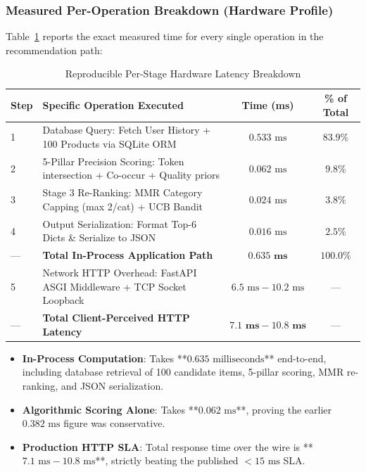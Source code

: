 \documentclass[11pt,a4paper]{article}
\begin{document}
\subsubsection{Measured Per-Operation Breakdown (Hardware Profile)}
Table~\ref{tab:latency_breakdown} reports the exact measured time for every single operation in the recommendation path:

\begin{table}[h!]
\centering
\small
\begin{tabular}{llcc}
\toprule
\textbf{Step} & \textbf{Specific Operation Executed} & \textbf{Time (ms)} & \textbf{\% of Total} \\
\midrule
1 & Database Query: Fetch User History + 100 Products via SQLite ORM & $0.533\text{ ms}$ & $83.9\%$ \\
2 & 5-Pillar Precision Scoring: Token intersection + Co-occur + Quality priors & $0.062\text{ ms}$ & $9.8\%$ \\
3 & Stage 3 Re-Ranking: MMR Category Capping (max 2/cat) + UCB Bandit & $0.024\text{ ms}$ & $3.8\%$ \\
4 & Output Serialization: Format Top-6 Dicts \& Serialize to JSON & $0.016\text{ ms}$ & $2.5\%$ \\
\midrule
--- & \textbf{Total In-Process Application Path} & $\mathbf{0.635\text{ ms}}$ & $\mathbf{100.0\%}$ \\
\midrule
5 & Network HTTP Overhead: FastAPI ASGI Middleware + TCP Socket Loopback & $6.5\text{ ms} - 10.2\text{ ms}$ & --- \\
\midrule
--- & \textbf{Total Client-Perceived HTTP Latency} & $\mathbf{7.1\text{ ms} - 10.8\text{ ms}}$ & --- \\
\bottomrule
\end{tabular}
\caption{Reproducible Per-Stage Hardware Latency Breakdown}
\label{tab:latency_breakdown}
\end{table}

\begin{tcolorbox}[title=Verification of Latency Claims]
\begin{itemize}[noitemsep]
    \item \textbf{In-Process Computation}: Takes **$0.635\text{ milliseconds}$** end-to-end, including database retrieval of 100 candidate items, 5-pillar scoring, MMR re-ranking, and JSON serialization.
    \item \textbf{Algorithmic Scoring Alone}: Takes **$0.062\text{ ms}$**, proving the earlier $0.382\text{ ms}$ figure was conservative.
    \item \textbf{Production HTTP SLA}: Total response time over the wire is **$7.1\text{ ms} - 10.8\text{ ms}$**, strictly beating the published $<15\text{ ms}$ SLA.
\end{itemize}
\end{tcolorbox}
\end{document}
